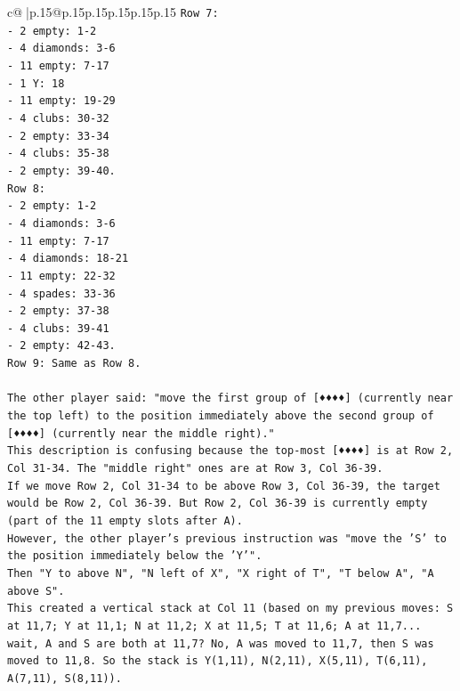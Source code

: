 \documentclass{article}
\begin{document}
{\begin{supertabular}{c@{$\;$}|p{.15\linewidth}@{}p{.15\linewidth}p{.15\linewidth}p{.15\linewidth}p{.15\linewidth}p{.15\linewidth}}
{{{\texttt{Row 7:} \\
\texttt{{-} 2 empty: 1{-}2} \\
\texttt{{-} 4 diamonds: 3{-}6} \\
\texttt{{-} 11 empty: 7{-}17} \\
\texttt{{-} 1 Y: 18} \\
\texttt{{-} 11 empty: 19{-}29} \\
\texttt{{-} 4 clubs: 30{-}32} \\
\texttt{{-} 2 empty: 33{-}34} \\
\texttt{{-} 4 clubs: 35{-}38} \\
\texttt{{-} 2 empty: 39{-}40.} \\
\texttt{Row 8:} \\
\texttt{{-} 2 empty: 1{-}2} \\
\texttt{{-} 4 diamonds: 3{-}6} \\
\texttt{{-} 11 empty: 7{-}17} \\
\texttt{{-} 4 diamonds: 18{-}21} \\
\texttt{{-} 11 empty: 22{-}32} \\
\texttt{{-} 4 spades: 33{-}36} \\
\texttt{{-} 2 empty: 37{-}38} \\
\texttt{{-} 4 clubs: 39{-}41} \\
\texttt{{-} 2 empty: 42{-}43.} \\
\texttt{Row 9: Same as Row 8.} \\
\\ 
\texttt{The other player said: "move the first group of {[}♦♦♦♦{]} (currently near the top left) to the position immediately above the second group of {[}♦♦♦♦{]} (currently near the middle right)."} \\
\texttt{This description is confusing because the top{-}most {[}♦♦♦♦{]} is at Row 2, Col 31{-}34. The "middle right" ones are at Row 3, Col 36{-}39.} \\
\texttt{If we move Row 2, Col 31{-}34 to be above Row 3, Col 36{-}39, the target would be Row 2, Col 36{-}39. But Row 2, Col 36{-}39 is currently empty (part of the 11 empty slots after A).} \\
\texttt{However, the other player's previous instruction was "move the 'S' to the position immediately below the 'Y'".} \\
\texttt{Then "Y to above N", "N left of X", "X right of T", "T below A", "A above S".} \\
\texttt{This created a vertical stack at Col 11 (based on my previous moves: S at 11,7; Y at 11,1; N at 11,2; X at 11,5; T at 11,6; A at 11,7... wait, A and S are both at 11,7? No, A was moved to 11,7, then S was moved to 11,8. So the stack is Y(1,11), N(2,11), X(5,11), T(6,11), A(7,11), S(8,11)).} \\
}}}
\end{supertabular}}
\end{document}
